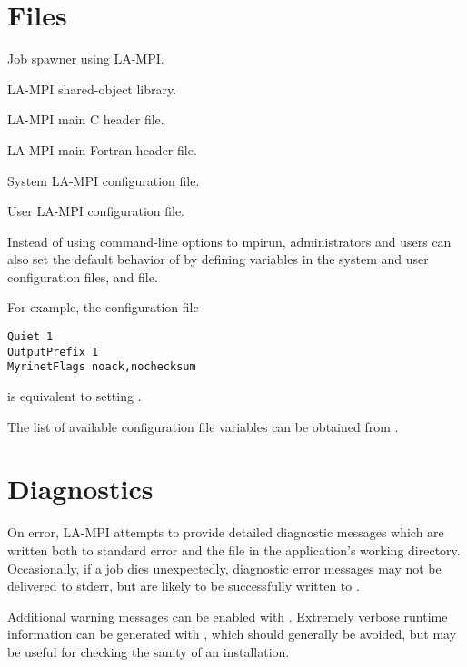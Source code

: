 \documentclass[english]{article}
\begin{document}
\section{Files}
\begin{Description}\setlength{\itemsep}{0cm}
\item[\File{mpirun}] Job spawner using LA-MPI.
\item[\File{libmpi.so}] LA-MPI shared-object library.
\item[\File{mpi.h}] LA-MPI main C header file.
\item[\File{mpif.h}] LA-MPI main Fortran header file.
\item[\File{\$MPI\_ROOT/etc/lampi.conf}] System LA-MPI configuration file.
\item[\File{\$HOME/.lampi.conf}] User LA-MPI configuration file.

Instead of using command-line options to mpirun, administrators and
users can also set the default behavior of  by defining
variables in the system and user configuration files,
 and 
file.

For example, the configuration file

\begin{verbatim}
Quiet 1
OutputPrefix 1
MyrinetFlags noack,nochecksum
\end{verbatim}

is equivalent to setting .

The list of available configuration file variables can be
obtained from .

\end{Description}

\section{Diagnostics}

On error, LA-MPI attempts to provide detailed diagnostic messages
which are written both to standard error and the file 
in the application's working directory.  Occasionally, if a job dies
unexpectedly, diagnostic error messages may not be delivered to
stderr, but are likely to be successfully written to .

Additional warning messages can be enabled with .
Extremely verbose runtime information can be generated with
, which should generally be avoided, but may be
useful for checking the sanity of an installation.
\end{document}
